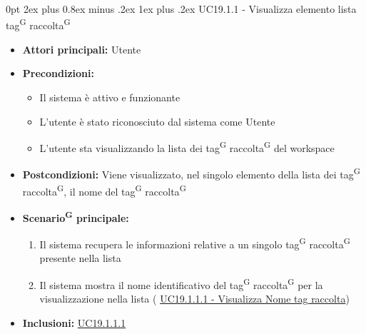 \documentclass[a4paper, 11pt]{article}
\makeatletter
\renewcommand\subparagraph{\@startsection{subparagraph}{5}
  {0pt}
  {2ex plus 0.8ex minus .2ex}
  {1ex plus .2ex}
  {\normalfont\normalsize\bfseries\color{AccentColor}}}
\makeatother
\begin{document}
\subparagraph{UC19.1.1 - Visualizza elemento lista tag\textsuperscript{G} raccolta\textsuperscript{G}} \label{UC19.1.1}
\begin{itemize}
	\item \textbf{Attori principali:} Utente
	\item \textbf{Precondizioni:}
	\begin{itemize}
		\item Il sistema è attivo e funzionante
		\item L'utente è stato riconosciuto dal sistema come Utente
		\item L'utente sta visualizzando la lista dei tag\textsuperscript{G} raccolta\textsuperscript{G} del workspace
	\end{itemize}
	\item \textbf{Postcondizioni:} Viene visualizzato, nel singolo elemento della lista dei tag\textsuperscript{G} raccolta\textsuperscript{G}, il nome del tag\textsuperscript{G} raccolta\textsuperscript{G}
	\item \textbf{Scenario\textsuperscript{G} principale:}
	\begin{enumerate}
		\item Il sistema recupera le informazioni relative a un singolo tag\textsuperscript{G} raccolta\textsuperscript{G} presente nella lista
		\item Il sistema mostra il nome identificativo del tag\textsuperscript{G} raccolta\textsuperscript{G} per la visualizzazione nella lista  ( \hyperref[UC19.1.1.1]{UC19.1.1.1 - Visualizza Nome tag raccolta})
	\end{enumerate}
	\item \textbf{Inclusioni:} \hyperref[UC19.1.1.1]{UC19.1.1.1}
\end{itemize}
\end{document}
